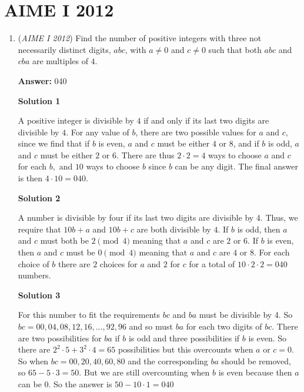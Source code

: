 \section{AIME I 2012}
        \begin{enumerate}
        	\item (\textit{AIME I 2012}) Find the number of positive integers with three not necessarily distinct digits, $abc$, with $a \neq 0$ and $c \neq 0$ such that both $abc$ and $cba$ are multiples of $4$.


 
 \textbf{Answer: }040



\textbf{Solution 1}

A positive integer is divisible by $4$ if and only if its last two digits are divisible by $4.$ For any value of $b$, there are two possible values for $a$ and $c$, since we find that if $b$ is even, $a$ and $c$ must be either $4$ or $8$, and if $b$ is odd, $a$ and $c$ must be either $2$ or $6$. There are thus $2 \cdot 2 = 4$ ways to choose $a$ and $c$ for each $b,$ and $10$ ways to choose $b$ since $b$ can be any digit. The final answer is then $4 \cdot 10 = \boxed{040}$.

 



\textbf{Solution 2}

A number is divisible by four if its last two digits are divisible by 4. Thus, we require that $10b + a$ and $10b + c$ are both divisible by $4$. If $b$ is odd, then $a$ and $c$ must both be $2 \pmod 4$ meaning that $a$ and $c$ are $2$ or $6$. If $b$ is even, then $a$ and $c$ must be $0 \pmod 4$ meaning that $a$ and $c$ are $4$ or $8$. For each choice of $b$ there are $2$ choices for $a$ and $2$ for $c$ for a total of $10 \cdot 2 \cdot 2 = \boxed{040}$ numbers.

 



\textbf{Solution 3}

For this number to fit the requirements $bc$ and $ba$ must be divisible by 4. So $bc = 00, 04, 08, 12, 16, ... , 92, 96$ and so must $ba$ for each two digits of $bc$. There are two possibilities for $ba$ if $b$ is odd and three possibilities if $b$ is even. So there are $2^{2} \cdot 5+3^{2} \cdot 4 = 65$ possibilities but this overcounts when $a$ or $c = 0$. So when $bc = 00, 20, 40, 60, 80$ and the corresponding $ba$ should be removed, so $65 - 5 \cdot 3 = 50$. But we are still overcounting when $b$ is even because then $a$ can be 0. So the answer is $50 - 10 \cdot 1 = \boxed{040}$ 


\end{enumerate}
